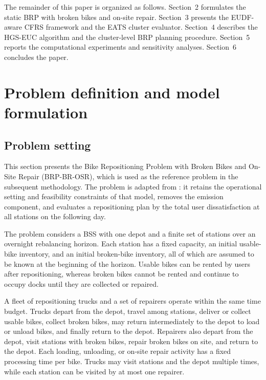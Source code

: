 The remainder of this paper is organized as follows. Section~2 formulates the
static BRP with broken bikes and on-site repair. Section~3 presents the
EUDF-aware CFRS framework and the EATS cluster evaluator. Section~4 describes
the HGS-EUC algorithm and the cluster-level BRP planning procedure. Section~5
reports the computational experiments and sensitivity analyses. Section~6
concludes the paper.

\section{Problem definition and model formulation}\label{sec:problem}

\subsection{Problem setting}

This section presents the Bike Repositioning Problem with Broken Bikes and
On-Site Repair (BRP-BR-OSR), which is used as the reference problem in the
subsequent methodology. The problem is adapted from
\citet{huRepositioningBikeSharing2025}: it retains the operational setting and
feasibility constraints of that model, removes the emission component, and
evaluates a repositioning plan by the total user dissatisfaction at all stations
on the following day.

The problem considers a BSS with one depot and a finite set of stations over an
overnight rebalancing horizon. Each station has a fixed capacity, an initial
usable-bike inventory, and an initial broken-bike inventory, all of which are
assumed to be known at the beginning of the horizon. Usable bikes can be rented
by users after repositioning, whereas broken bikes cannot be rented and continue
to occupy docks until they are collected or repaired.

A fleet of repositioning trucks and a set of repairers operate within the same
time budget. Trucks depart from the depot, travel among stations, deliver or
collect usable bikes, collect broken bikes, may return intermediately to the
depot to load or unload bikes, and finally return to the depot. Repairers also
depart from the depot, visit stations with broken bikes, repair broken bikes
on site, and return to the depot. Each loading, unloading, or on-site repair
activity has a fixed processing time per bike. Trucks may visit stations and the
depot multiple times, while each station can be visited by at most one repairer.

